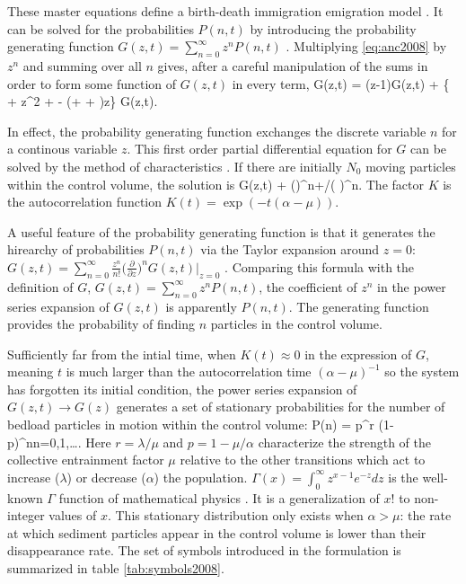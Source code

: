 These master equations define a birth-death immigration emigration model \citep[e.g.][]{Cox1965, Gardiner1983}. 
It can be solved for the probabilities $P(n,t)$ by introducing the probability generating function $G(z,t) = \sum_{n=0}^\infty z^n P(n,t)$ \citep{Cox1965, Gardiner1983, Ancey2008}. 
Multiplying \ref{eq:anc2008} by $z^n$ and summing over all $n$ gives, after a careful manipulation of the sums in order to form some function of $G(z,t)$ in every term, 
\be {} G(z,t) = \lambda(z-1)G(z,t) + \{ \sigma + \mu z^2 + \nu - (\mu + \sigma + \nu)z\}  G(z,t). \ee

In effect, the probability generating function exchanges the discrete variable $n$ for a continous variable $z$. 
This first order partial differential equation for $G$ can be solved by the method of characteristics \citep{Cox1965, Garabedian1964}. 
If there are initially $N_0$ moving particles within the control volume, the solution is 
\be G(z,t) + \Big(\Big)^{n+\lambda/\mu}\Big( \Big)^n. \label{eq:generator}\ee
The factor $K$ is the autocorrelation function $K(t) = \exp(-t(\alpha-\mu)).$

A useful feature of the probability generating function is that it generates the hirearchy of probabilities $P(n,t)$ via the Taylor expansion around $z=0$: $G(z,t) = \sum_{n=0}^\infty \frac{z^n}{n!}\big(\frac{\partial}{\partial z}\big)^n G(z,t) |_{z=0}$ \citep{Cox1965}. Comparing this formula with the definition of $G$, $G(z,t) = \sum_{n=0}^\infty z^n P(n,t)$, the coefficient of $z^n$ in the power series expansion of $G(z,t)$ is  apparently $P(n,t)$. 
The generating function provides the probability of finding $n$ particles in the control volume. 

Sufficiently far from the intial time, when $K(t) \approx 0 $ in the expression of $G$, meaning $t$ is much larger than the autocorrelation time $(\alpha-\mu)^{-1}$ so the system has forgotten its initial condition, the power series expansion of $G(z,t) \rightarrow G(z)$ generates a set of stationary probabilities for the number of bedload particles in motion within the control volume: 
\be P(n) =  p^r (1-p)^n\text{, }n=0,1,\dots. \label{eq:negbin0}\ee
Here $r=\lambda/\mu$ and $p = 1-\mu/\alpha$ characterize the strength of the collective entrainment factor $\mu$ relative to the other transitions which act to increase ($\lambda$) or decrease ($\alpha$) the population.  
$\Gamma(x) = \int_0^\infty z ^{x-1} e^{-z} dz$ is the well-known $\Gamma$ function of mathematical physics \citep{Boas2005, Mathews1971}. It is a generalization of $x!$ to non-integer values of $x$. 
This stationary distribution only exists when $\alpha>\mu$: the rate at which sediment particles appear in the control volume is lower than their disappearance rate. 
The set of symbols introduced in the \citet{Ancey2008} formulation is summarized in table \ref{tab:symbols2008}. 

